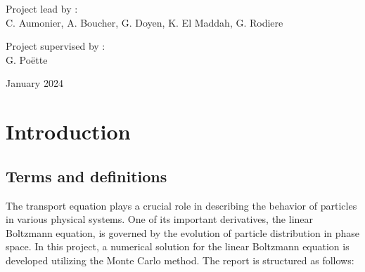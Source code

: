 \documentclass[a4paper, 11pt]{article}
\begin{document}
\begin{titlepage}
		\bigskip
		\bigskip
		
		\centering
		\Large{Project lead by :} \\
		\Large{C. Aumonier, A. Boucher, G. Doyen, K. El Maddah, G. Rodiere}
		
		
		\vfill\vfill\vfill %
		{\Large  Project supervised by :}\\
		\Large{G. Poëtte}
		
		\vspace{0,5cm}
		
		{\large January 2024} %
		
		
		
		
		\vfill %
		
	\end{titlepage}
	
\tableofcontents

\newpage
	
\section{Introduction}


	
\subsection{Terms and definitions}
	
	The transport equation plays a crucial role in describing the behavior of particles in various physical systems. One of its important derivatives, the linear Boltzmann equation, is governed by the evolution of particle distribution in phase space. In this project, a numerical solution for the linear Boltzmann equation is developed utilizing the Monte Carlo method. The report is structured as follows:
	
\end{document}
